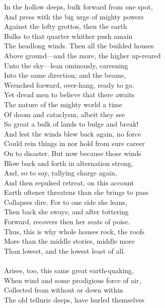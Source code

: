 In the hollow deeps, bulk forward from one spot,\\
And press with the big urge of mighty powers\\
Against the lofty grottos, then the earth\\
Bulks to that quarter whither push amain\\
The headlong winds. Then all the builded houses\\
Above ground—and the more, the higher up-reared\\
Unto the sky—lean ominously, careening\\
Into the same direction; and the beams,\\
Wrenched forward, over-hang, ready to go.\\
Yet dread men to believe that there awaits\\
The nature of the mighty world a time\\
Of doom and cataclysm, albeit they see\\
So great a bulk of lands to bulge and break!\\
And lest the winds blew back again, no force\\
Could rein things in nor hold from sure career\\
On to disaster. But now because those winds\\
Blow back and forth in alternation strong,\\
And, so to say, rallying charge again,\\
And then repulsed retreat, on this account\\
Earth oftener threatens than she brings to pass\\
Collapses dire. For to one side she leans,\\
Then back she sways; and after tottering\\
Forward, recovers then her seats of poise.\\
Thus, this is why whole houses rock, the roofs\\
More than the middle stories, middle more\\
Than lowest, and the lowest least of all.\\
\\
Arises, too, this same great earth-quaking,\\
When wind and some prodigious force of air,\\
Collected from without or down within\\
The old telluric deeps, have hurled themselves\\
